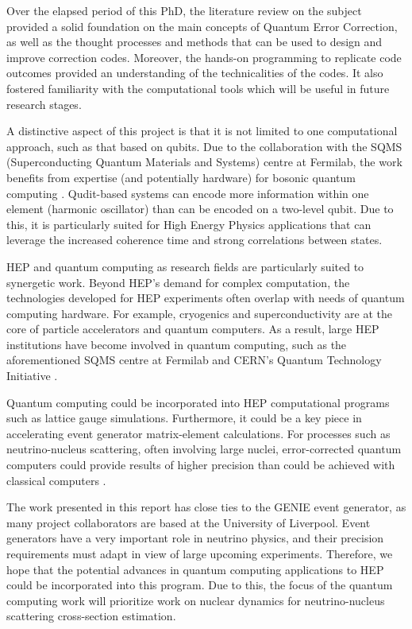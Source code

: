Over the elapsed period of this PhD, the literature review on the subject provided a solid foundation on the main concepts of Quantum Error Correction, as well as the thought processes and methods that can be used to design and improve correction codes. Moreover, the hands-on programming to replicate code outcomes provided an understanding of the technicalities of the codes. It also fostered familiarity with the computational tools which will be useful in future research stages.

A distinctive aspect of this project is that it is not limited to one computational approach, such as that based on qubits. Due to the collaboration with the SQMS (Superconducting Quantum Materials and Systems) centre at Fermilab, the work benefits from expertise (and potentially hardware) for bosonic quantum computing \cite{sqms}. Qudit-based systems can encode more information within one element (harmonic oscillator) than can be encoded on a two-level qubit. Due to this, it is particularly suited for High Energy Physics applications that can leverage the increased coherence time and strong correlations between states\cite{kurkcuoglu}.

HEP and quantum computing as research fields are particularly suited to synergetic work. Beyond HEP's demand for complex computation, the technologies developed for HEP experiments often overlap with needs of quantum computing hardware. For example, cryogenics and superconductivity are at the core of particle accelerators and quantum computers. As a result, large HEP institutions have become involved in quantum computing, such as the aforementioned SQMS centre at Fermilab and CERN's Quantum Technology Initiative \cite{Humble2022,cernqti}. 

Quantum computing could be incorporated into HEP computational programs such as lattice gauge simulations. Furthermore, it could be a key piece in accelerating event generator matrix-element calculations. For processes such as neutrino-nucleus scattering, often involving large nuclei, error-corrected quantum computers could provide results of higher precision than could be achieved with classical computers \cite{Humble2022}. 

The work presented in this report has close ties to the GENIE event generator, as many project collaborators are based at the University of Liverpool. Event generators have a very important role in neutrino physics, and their precision requirements must adapt in view of large upcoming experiments\cite{Andreopoulos2021}. Therefore, we hope that the potential advances in quantum computing applications to HEP could be incorporated into this program. Due to this, the focus of the quantum computing work will prioritize work on nuclear dynamics for neutrino-nucleus scattering cross-section estimation.

